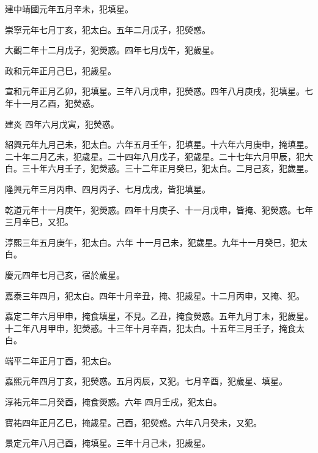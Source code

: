 \begin{pinyinscope}
 建中靖國元年五月辛未，犯填星。



 崇寧元年七月丁亥，犯太白。五年二月戊子，犯熒惑。



 大觀二年十二月戊子，犯熒惑。四年七月戊午，犯歲星。



 政和元年正月己巳，犯歲星。



 宣和元年正月乙卯，犯填星。三年八月戊申，犯熒惑。四年八月庚戌，犯填星。七年十一月乙酉，犯熒惑。



 建炎
 四年六月戊寅，犯熒惑。



 紹興元年九月己未，犯太白。六年五月壬午，犯填星。十六年六月庚申，掩填星。二十年二月乙未，犯歲星。二十四年八月戊子，犯歲星。二十七年六月甲辰，犯大白。三十年六月壬子，犯熒惑。三十二年正月癸巳，犯太白。二月己亥，犯歲星。



 隆興元年三月丙申、四月丙子、七月戊戌，皆犯填星。



 乾道元年十一月庚午，犯熒惑。四年十月庚子、十一月戊申，皆掩、犯熒惑。七年三月辛巳，又犯。



 淳熙三年五月庚午，犯太白。六年
 十一月己未，犯歲星。九年十一月癸巳，犯太白。



 慶元四年七月己亥，宿於歲星。



 嘉泰三年四月，犯太白。四年十月辛丑，掩、犯歲星。十二月丙申，又掩、犯。



 嘉定二年六月甲申，掩食填星，不見。乙丑，掩食熒惑。五年九月丁未，犯歲星。十二年八月甲申，犯熒惑。十三年十月辛酉，犯太白。十五年三月壬子，掩食太白。



 端平二年正月丁酉，犯太白。



 嘉熙元年四月丁亥，犯熒惑。五月丙辰，又犯。七月辛酉，犯歲星、填星。



 淳祐元年二月癸酉，掩食熒惑。六年
 四月壬戌，犯太白。



 寶祐四年正月乙巳，掩歲星。己酉，犯熒惑。六年八月癸未，又犯。



 景定元年八月己酉，掩填星。三年十月己未，犯歲星。




\end{pinyinscope}
